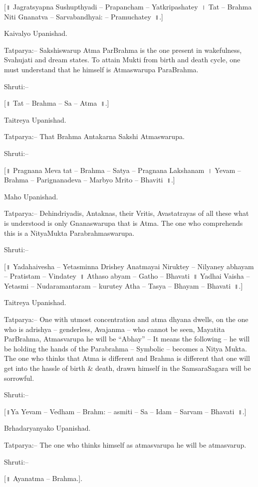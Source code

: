 [॥ Jagratsyapna Sushupthyadi – Prapancham – Yatkripashatey~। Tat – Brahma Niti Gnanatva – Sarvabandhyai: – Pramuchatey~॥.]

Kaivalyo Upanishad.

Tatparya:– Sakshiswarup Atma ParBrahma is the one present in wakefulness, Svahujati and dream states. To attain Mukti from birth and death cycle, one must understand that he himself is Atmaswarupa ParaBrahma.

Shruti:–

[॥ Tat – Brahma – Sa – Atma~॥.]

Taitreya Upanishad.

Tatparya:– That Brahma Antakarna Sakshi Atmaswarupa.

Shruti:–

[॥ Pragnana Meva tat – Brahma – Satya – Pragnana Lakshanam~। Yevam – Brahma – Parignanadeva – Marbyo Mrito – Bhaviti~॥.]

Maho Upanishad.

Tatparya:– Dehindriyadis, Antaknas, their Vritis, Avastatrayas of all these what is understood is only Gnanaswarupa that is Atma. The one who comprehends this is a NityaMukta Parabrahmaswarupa.

Shruti:–

[॥ Yadahaivesha – Yetasminna Drishey Anatmayai Niruktey – Nilyaney abhayam – Pratistam – Vindatey~॥ Athaso abyam – Gatho – Bhavati~॥ Yadhai Vaisha – Yetasmi – Nudaramantaram – kurutey Atha – Tasya – Bhayam – Bhavati~॥.]

Taitreya Upanishad.

Tatparya:– One with utmost concentration and atma dhyana dwells, on the one who is adrishya – genderless, Avajanma – who cannot be seen, Mayatita ParBrahma, Atmasvarupa he will be “Abhay” – It means the following – he will be holding the hands of the Parabrahma – Symbolic – becomes a Nitya Mukta. The one who thinks that Atma is different and Brahma is different that one will get into the hassle of birth \& death, drawn himself in the SamsaraSagara will be sorrowful.

Shruti:–

[॥Ya Yevam – Vedham – Brahm: – asmiti – Sa – Idam – Sarvam – Bhavati~॥.]

Brhadaryanyako Upanishad.

Tatparya:– The one who thinks himself as atmasvarupa he will be atmasvarup.

Shruti:–

[॥ Ayanatma – Brahma.].

